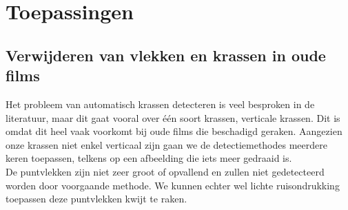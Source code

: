 \documentclass[titlepage]{article}
\begin{document}

\section{Toepassingen}
\subsection{Verwijderen van vlekken en krassen in oude films}
Het probleem van automatisch krassen detecteren is veel besproken in de literatuur, maar dit gaat vooral over \'e\'en soort  krassen, verticale krassen. Dit is omdat dit heel vaak voorkomt bij oude films die beschadigd geraken. Aangezien onze krassen niet enkel verticaal zijn gaan we de detectiemethodes meerdere keren toepassen, telkens op een afbeelding die iets meer gedraaid is.\\
De puntvlekken zijn niet zeer groot of opvallend en zullen niet gedetecteerd worden door voorgaande methode. We kunnen echter wel lichte ruisondrukking toepassen deze puntvlekken kwijt te raken.
\end{document}
